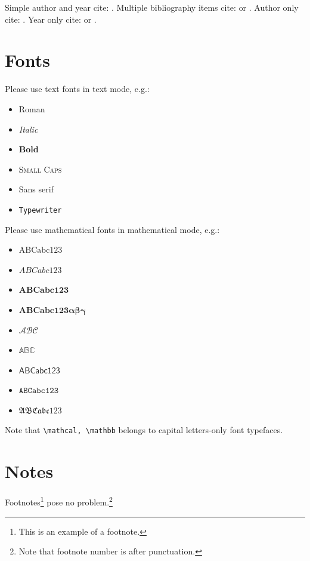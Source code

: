 \documentclass[aoas]{imsart}
\numberwithin{equation}{section}
\theoremstyle{plain}
\theoremstyle{remark}
\begin{document}
Simple author and year cite: \citet{billingsley2013convergence}.
Multiple bibliography items cite:
\cite{billingsley2013convergence,bourbaki1966general} or
\citep{billingsley2013convergence, bourbaki1966general}. Author only
cite: \citeauthor{ethier1985markov}. Year only cite:
\citeyear{prokhorov1956convergence} or
\citeyearpar{prokhorov1956convergence}.

\hypertarget{fonts}{%
\section{Fonts}\label{fonts}}

Please use text fonts in text mode, e.g.:

\begin{itemize}
\item[]\textrm{Roman}
\item[]\textit{Italic}
\item[]\textbf{Bold}
\item[]\textsc{Small Caps}
\item[]\textsf{Sans serif}
\item[]\texttt{Typewriter}
\end{itemize}

Please use mathematical fonts in mathematical mode, e.g.:

\begin{itemize}
\item[] $\mathrm{ABCabc123}$
\item[] $\mathit{ABCabc123}$
\item[] $\mathbf{ABCabc123}$
\item[] $\boldsymbol{ABCabc123\alpha\beta\gamma}$
\item[] $\mathcal{ABC}$
\item[] $\mathbb{ABC}$
\item[] $\mathsf{ABCabc123}$
\item[] $\mathtt{ABCabc123}$
\item[] $\mathfrak{ABCabc123}$
\end{itemize}

Note that \verb|\mathcal, \mathbb| belongs to capital letters-only font
typefaces.

\hypertarget{notes}{%
\section{Notes}\label{notes}}

Footnotes\footnote{This is an example of a footnote.} pose no
problem.\footnote{Note that footnote number is after punctuation.}
\end{document}
